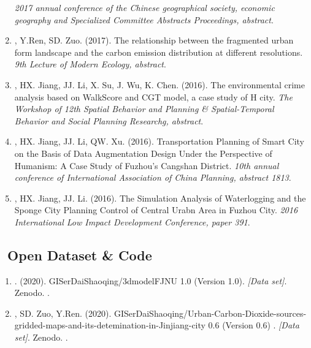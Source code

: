 \begin{enumerate}
    \textit{2017 annual conference of the Chinese geographical society, economic geography and Specialized Committee Abstracts Proceedings, abstract}.
\item
    \Shaoqing, Y.Ren, SD. Zuo. (2017).
    The relationship between the fragmented urban form landscape and the carbon emission distribution at different resolutions.
    \textit{9th Lecture of Modern Ecology, abstract}.
\item
    \Shaoqing, HX. Jiang, JJ. Li, X. Su, J. Wu, K. Chen. (2016).
    The environmental crime analysis based on WalkScore and CGT model, a case study of H city.
    \textit{The Workshop of 12th Spatial Behavior and Planning \& Spatial-Temporal Behavior and Social Planning Researchg, abstract}.
\item
    \Shaoqing, HX. Jiang, JJ. Li, QW. Xu. (2016).
    Transportation Planning of Smart City on the Basis of Data Augmentation Design Under the Perspective of Humanism: A Case Study of Fuzhou's Cangshan District.
    \textit{10th annual conference of International Association of China Planning, abstract 1813}.
\item
   \Shaoqing, HX. Jiang, JJ. Li. (2016).
    The Simulation Analysis of Waterlogging and the Sponge City Planning Control of Central Urabn Area in Fuzhou City.
    \textit{2016 International Low Impact Development Conference, paper 391}.
\end{enumerate}

\subsection*{\texorpdfstring{\faBook\ Open Dataset \& Code}{Open Dataset \& Code}}
\begin{enumerate}
\item
   \Shaoqing. (2020).
    GISerDaiShaoqing/3dmodelFJNU 1.0 (Version 1.0).
    \textit{[Data set]}. Zenodo. 
    .
\item
   \Shaoqing, SD. Zuo, Y.Ren. (2020).
    GISerDaiShaoqing/Urban-Carbon-Dioxide-sources-gridded-maps-and-its-detemination-in-Jinjiang-city 0.6 (Version 0.6) .
    \textit{[Data set]}. Zenodo. 
    .
\end{enumerate}

